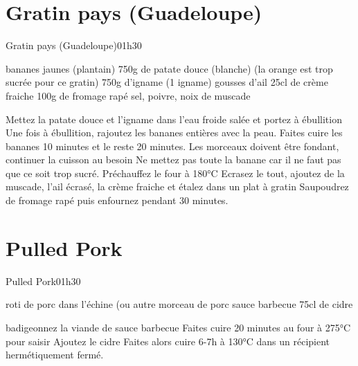 {\section{Gratin pays (Guadeloupe)}
\begin{recette}{Gratin pays (Guadeloupe)}{0}{1h30}{}
\begin{ingredients}
 bananes jaunes (plantain)
\ingredient 750g de patate douce (blanche) (la orange est trop sucrée pour ce gratin)
\ingredient 750g d'igname (1 igname)
 gousses d'ail
\ingredient 25cl de crème fraiche %
\ingredient 100g de fromage rapé
\ingredient sel, poivre, noix de muscade
\end{ingredients}

\begin{preparation}
\etape Mettez la patate douce et l'igname dans l'eau froide salée et portez à ébullition
\etape Une fois à ébullition, rajoutez les bananes entières avec la peau. Faites cuire les bananes 10 minutes et le reste 20 minutes. Les morceaux doivent être fondant, continuer la cuisson au besoin
\etape Ne mettez pas toute la banane car il ne faut pas que ce soit trop sucré. 
\etape Préchauffez le four à 180°C
\etape Ecrasez le tout, ajoutez de la muscade, l'ail écrasé, la crème fraiche et étalez dans un plat à gratin
\etape Saupoudrez de fromage rapé puis enfournez pendant 30 minutes.
\end{preparation}
\end{recette}

\section{Pulled Pork}
\begin{recette}{Pulled Pork}{0}{1h30}{}
\begin{ingredients}
\ingredient roti de porc dans l'échine (ou autre morceau de porc
\ingredient sauce barbecue
\ingredient 75cl de cidre
\end{ingredients}

\begin{preparation}
\etape badigeonnez la viande de sauce barbecue
\etape Faites cuire 20 minutes au four à 275°C pour saisir
\etape Ajoutez le cidre
\etape Faites alors cuire 6-7h à 130°C dans un récipient hermétiquement fermé.
\end{preparation}
\end{recette}

}
